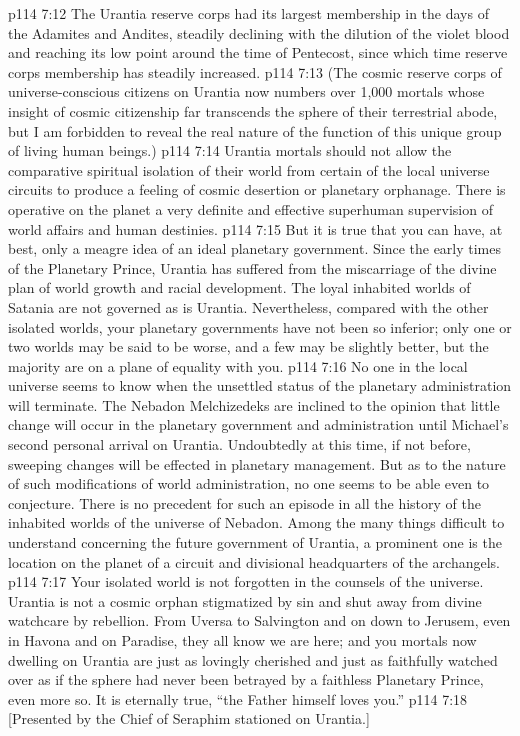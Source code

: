 \vs p114 7:12 The Urantia reserve corps had its largest membership in the days of the Adamites and Andites, steadily declining with the dilution of the violet blood and reaching its low point around the time of Pentecost, since which time reserve corps membership has steadily increased.
\vs p114 7:13 \pc (The cosmic reserve corps of universe\hyp{}conscious citizens on Urantia now numbers over 1,000 mortals whose insight of cosmic citizenship far transcends the sphere of their terrestrial abode, but I am forbidden to reveal the real nature of the function of this unique group of living human beings.)
\vs p114 7:14 \pc Urantia mortals should not allow the comparative spiritual isolation of their world from certain of the local universe circuits to produce a feeling of cosmic desertion or planetary orphanage. There is operative on the planet a very definite and effective superhuman supervision of world affairs and human destinies.
\vs p114 7:15 But it is true that you can have, at best, only a meagre idea of an ideal planetary government. Since the early times of the Planetary Prince, Urantia has suffered from the miscarriage of the divine plan of world growth and racial development. The loyal inhabited worlds of Satania are not governed as is Urantia. Nevertheless, compared with the other isolated worlds, your planetary governments have not been so inferior; only one or two worlds may be said to be worse, and a few may be slightly better, but the majority are on a plane of equality with you.
\vs p114 7:16 No one in the local universe seems to know when the unsettled status of the planetary administration will terminate. The Nebadon Melchizedeks are inclined to the opinion that little change will occur in the planetary government and administration until Michael’s second personal arrival on Urantia. Undoubtedly at this time, if not before, sweeping changes will be effected in planetary management. But as to the nature of such modifications of world administration, no one seems to be able even to conjecture. There is no precedent for such an episode in all the history of the inhabited worlds of the universe of Nebadon. Among the many things difficult to understand concerning the future government of Urantia, a prominent one is the location on the planet of a circuit and divisional headquarters of the archangels.
\vs p114 7:17 Your isolated world is not forgotten in the counsels of the universe. Urantia is not a cosmic orphan stigmatized by sin and shut away from divine watchcare by rebellion. From Uversa to Salvington and on down to Jerusem, even in Havona and on Paradise, they all know we are here; and you mortals now dwelling on Urantia are just as lovingly cherished and just as faithfully watched over as if the sphere had never been betrayed by a faithless Planetary Prince, even more so. It is eternally true, “the Father himself loves you.”
\vsetoff
\vs p114 7:18 [Presented by the Chief of Seraphim stationed on Urantia.]
\quizlink
